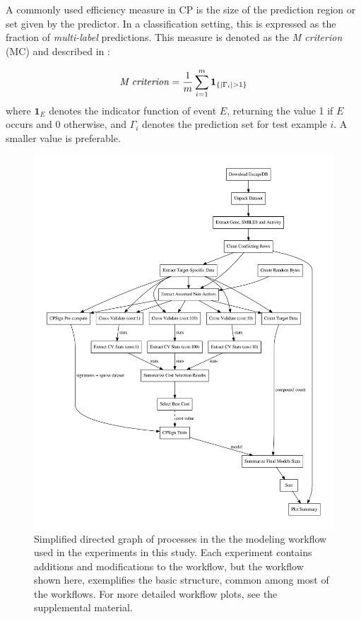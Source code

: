 \documentclass[utf8]{frontiersSCNS} %
\begin{document}
A commonly used efficiency measure in CP is the size of the prediction region or set 
given by the predictor. In a classification setting, this is expressed as the fraction of
\textit{multi-label} predictions. This measure is denoted as the \textit{M criterion} (MC) and described
in \cite{Vovk2016}:

\begin{equation}
\text{\textit{M criterion}} = \frac{ 1}{m} \sum\limits_{i=1}^{m}  \boldsymbol{1}_{\{|\Gamma_i|>1\}}	
\end{equation}
where $\boldsymbol{1}_E$ denotes the indicator function of event $E$, returning the 
value 1 if $E$ occurs and 0 otherwise, and $\Gamma_i$ denotes the prediction set 
for test example $i$.  A smaller value is preferable. 



\begin{figure}[h!]
\includegraphics[width=\textwidth]{figures/workflow_graph_clean.pdf}
    \caption{Simplified directed graph of processes in the the modeling workflow used
    in the experiments in this study. Each experiment contains additions and modifications
    to the workflow, but the workflow shown here, exemplifies the basic structure,
    common among most of the workflows. For more detailed workflow
    plots, see the supplemental material.}
    \label{fig:workflow_graph_clean}
\end{figure}
\end{document}
